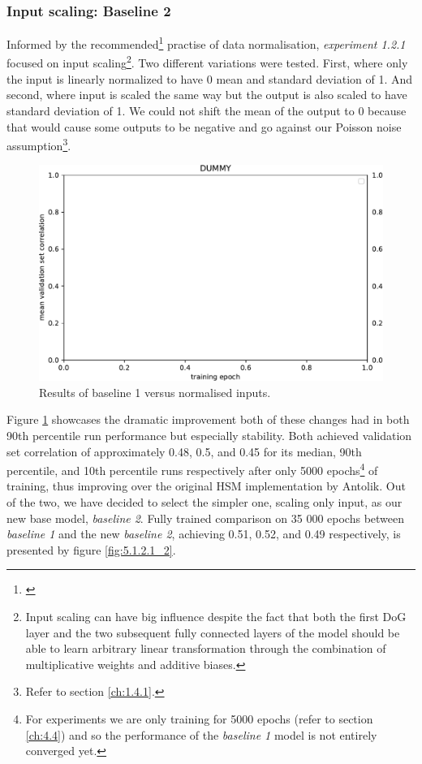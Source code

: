 \subsubsection{Input scaling: Baseline 2}
Informed by the recommended\footnote{\cite{10.5555/645754.668382}} practise of data normalisation, \emph{experiment 1.2.1} focused on input scaling\footnote{Input scaling can have big influence despite the fact that both the first DoG layer and the two subsequent fully connected layers of the model should be able to learn arbitrary linear transformation through the combination of multiplicative weights and additive biases.}. Two different variations were tested. First, where only the input is linearly normalized to have 0 mean and standard deviation of 1. And second, where input is scaled the same way but the output is also scaled to have standard deviation of 1. We could not shift the mean of the output to 0 because that would cause some outputs to be negative and go against our Poisson noise assumption\footnote{Refer to section \ref{ch:1.4.1}.}.

\begin{figure}[H]
    \centering
    \includegraphics[width=1\textwidth]{../figures/05_dummy}
    \caption[Experiment 1.2.1]{Results of baseline 1 versus normalised inputs\protect\footnotemark.}
    \label{fig:5.1.2.1}
\end{figure}

Figure \ref{fig:5.1.2.1} showcases the dramatic improvement both of these changes had in both 90th percentile run performance but especially stability. Both achieved validation set correlation of approximately 0.48, 0.5, and 0.45 for its median, 90th percentile, and 10th percentile runs respectively after only 5000 epochs\footnote{For experiments we are only training for 5000 epochs (refer to section  \ref{ch:4.4}) and so the performance of the \emph{baseline 1} model is not entirely converged yet.} of training, thus improving over the original HSM implementation by Antolik. Out of the two, we have decided to select the simpler one, scaling only input, as our new base model, \emph{baseline 2}. Fully trained comparison on 35 000 epochs between \emph{baseline 1} and the new \emph{baseline 2}, achieving 0.51, 0.52, and 0.49 respectively, is presented by figure \ref{fig:5.1.2.1_2}.

